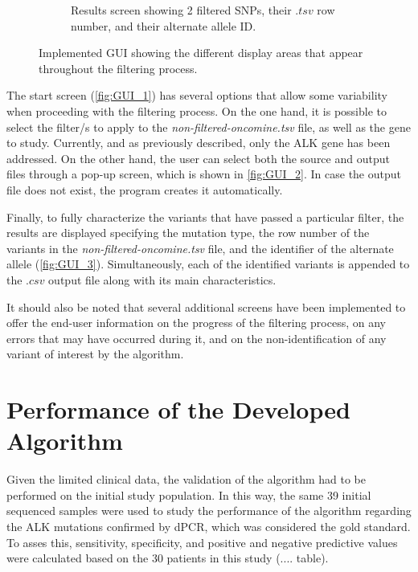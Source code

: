 \begin{figure}[ht]
\begin{subfigure}{0.52\textwidth}
        \caption{Results screen showing 2 filtered SNPs, their $.tsv$ row number, and their alternate allele ID.}
        \label{fig:GUI_3}
    \end{subfigure}
    \hfill
    \caption{Implemented GUI showing the different display areas that appear throughout the filtering process.}
    \label{fig:GUI}
\end{figure}

The start screen (\autoref{fig:GUI_1}) has several options that allow some variability when proceeding with the filtering process. On the one hand, it is possible to select the filter\slash s to apply to the \textit{non-filtered-oncomine.tsv} file, as well as the gene to study. Currently, and as previously described, only the ALK gene has been addressed. On the other hand, the user can select both the source and output files through a pop-up screen, which is shown in \autoref{fig:GUI_2}. In case the output file does not exist, the program creates it automatically.

Finally, to fully characterize the variants that have passed a particular filter, the results are displayed specifying the mutation type, the row number of the variants in the \textit{non-filtered-oncomine.tsv} file, and the identifier of the alternate allele (\autoref{fig:GUI_3}). Simultaneously, each of the identified variants is appended to the $.csv$ output file along with its main characteristics.

It should also be noted that several additional screens have been implemented to offer the end-user information on the progress of the filtering process, on any errors that may have occurred during it, and on the non-identification of any variant of interest by the algorithm.

\section{Performance of the Developed Algorithm}

Given the limited clinical data, the validation of the algorithm had to be performed on the initial study population. In this way, the same 39 initial sequenced samples were used to study the performance of the algorithm regarding the ALK mutations confirmed by dPCR, which was considered the gold standard. To asses this, sensitivity, specificity, and positive and negative predictive values were calculated based on the 30 patients in this study (.... table).



